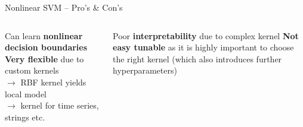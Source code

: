 \begin{frame2}{Nonlinear SVM -- Pro's \& Con's}

\begin{columns}[T, totalwidth=\textwidth]
  \begin{column}{0.53\textwidth}    
    \begin{itemize}
       \positem Can learn \textbf{nonlinear decision boundaries}
       \positem \textbf{Very flexible} due to custom kernels \\
       $\rightarrow$ RBF kernel yields local model \\
       $\rightarrow$ kernel for time series, strings etc.
    \end{itemize}
  \end{column}

  \begin{column}{0.47\textwidth}
    \begin{itemize}
       \negitem Poor \textbf{interpretability} due to complex kernel
       \negitem \textbf{Not easy tunable} as it is highly important to choose the right kernel (which also introduces further hyperparameters)
    \end{itemize}
  \end{column}
\end{columns}


\end{frame2}
